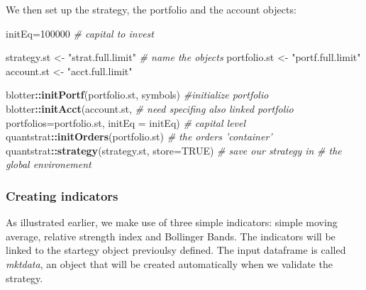 \documentclass[
  11pt,
]{article}
\newenvironment{Shaded}{\begin{snugshade}}{\end{snugshade}}
\newcommand{\CommentTok}[1]{\textcolor[rgb]{0.56,0.35,0.01}{\textit{#1}}}
\newcommand{\DataTypeTok}[1]{\textcolor[rgb]{0.13,0.29,0.53}{#1}}
\newcommand{\DecValTok}[1]{\textcolor[rgb]{0.00,0.00,0.81}{#1}}
\newcommand{\KeywordTok}[1]{\textcolor[rgb]{0.13,0.29,0.53}{\textbf{#1}}}
\newcommand{\NormalTok}[1]{#1}
\newcommand{\OperatorTok}[1]{\textcolor[rgb]{0.81,0.36,0.00}{\textbf{#1}}}
\newcommand{\OtherTok}[1]{\textcolor[rgb]{0.56,0.35,0.01}{#1}}
\newcommand{\StringTok}[1]{\textcolor[rgb]{0.31,0.60,0.02}{#1}}
\begin{document}
We then set up the strategy, the portfolio and the account objects:

\begin{Shaded}
\begin{Highlighting}[]
\NormalTok{initEq=}\DecValTok{100000} \CommentTok{# capital to invest}

\NormalTok{strategy.st <-}\StringTok{ "strat.full.limit"} \CommentTok{# name the objects}
\NormalTok{portfolio.st <-}\StringTok{ "portf.full.limit"}
\NormalTok{account.st <-}\StringTok{ "acct.full.limit"}

\NormalTok{blotter}\OperatorTok{::}\KeywordTok{initPortf}\NormalTok{(portfolio.st, symbols) }\CommentTok{#initialize portfolio}
\NormalTok{blotter}\OperatorTok{::}\KeywordTok{initAcct}\NormalTok{(account.st, }\CommentTok{# need specifing also linked portfolio }
         \DataTypeTok{portfolios=}\NormalTok{portfolio.st, }
         \DataTypeTok{initEq =}\NormalTok{ initEq) }\CommentTok{# capital level}
\NormalTok{quantstrat}\OperatorTok{::}\KeywordTok{initOrders}\NormalTok{(portfolio.st) }\CommentTok{# the orders 'container'}
\NormalTok{quantstrat}\OperatorTok{::}\KeywordTok{strategy}\NormalTok{(strategy.st, }\DataTypeTok{store=}\OtherTok{TRUE}\NormalTok{) }\CommentTok{# save our strategy in }
\CommentTok{# the global environement}
\end{Highlighting}
\end{Shaded}

\hypertarget{creating-indicators}{%
\subsubsection{Creating indicators}\label{creating-indicators}}

As illustrated earlier, we make use of three simple indicators: simple
moving average, relative strength index and Bollinger Bands. The
indicators will be linked to the startegy object previoulsy defined. The
input dataframe is called \emph{mktdata}, an object that will be created
automatically when we validate the strategy.
\end{document}
